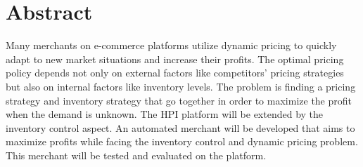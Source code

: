 \chapter*{Abstract}

Many merchants on e-commerce platforms utilize dynamic pricing to quickly adapt to new market situations and increase their profits. %
The optimal pricing policy depends not only on external factors like competitors' pricing strategies but also on internal factors like inventory levels. %
The problem is finding a pricing strategy and inventory strategy that go together in order to maximize the profit when the demand is unknown.
The HPI \pricewars platform will be extended by the inventory control aspect.
An automated merchant will be developed that aims to maximize profits while facing the inventory control and dynamic pricing problem.
This merchant will be tested and evaluated on the \pricewars platform.